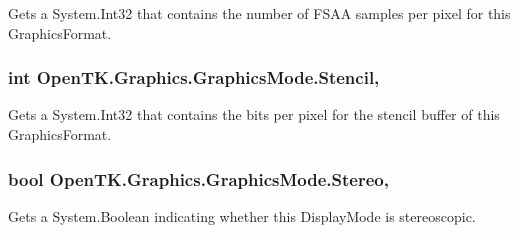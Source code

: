 Gets a System.\-Int32 that contains the number of F\-S\-A\-A samples per pixel for this Graphics\-Format. 

\hypertarget{class_open_t_k_1_1_graphics_1_1_graphics_mode_a962610eb764cb1f680149d17584606e1}{
\subsubsection[{Stencil}]{\setlength{\rightskip}{0pt plus 5cm}int Open\-T\-K.\-Graphics.\-Graphics\-Mode.\-Stencil\hspace{0.3cm}{\ttfamily [get]}, {\ttfamily [set]}}}\label{class_open_t_k_1_1_graphics_1_1_graphics_mode_a962610eb764cb1f680149d17584606e1}


Gets a System.\-Int32 that contains the bits per pixel for the stencil buffer of this Graphics\-Format. 

\hypertarget{class_open_t_k_1_1_graphics_1_1_graphics_mode_a3e966d924fdbc2939fb02139456d7bd1}{
\subsubsection[{Stereo}]{\setlength{\rightskip}{0pt plus 5cm}bool Open\-T\-K.\-Graphics.\-Graphics\-Mode.\-Stereo\hspace{0.3cm}{\ttfamily [get]}, {\ttfamily [set]}}}\label{class_open_t_k_1_1_graphics_1_1_graphics_mode_a3e966d924fdbc2939fb02139456d7bd1}


Gets a System.\-Boolean indicating whether this Display\-Mode is stereoscopic. 

